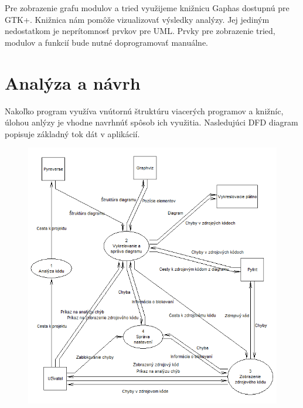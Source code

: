 \documentclass[11pt,oneside,final]{fithesis2}
\begin{document}
		Pre zobrazenie grafu modulov a tried využijeme knižnicu Gaphas dostupnú pre GTK+. Knižnica nám pomôže vizualizovať výsledky analýzy. Jej jediným nedostatkom je neprítomnosť prvkov pre UML. Prvky pre zobrazenie tried, modulov a funkcií bude nutné doprogramovať manuálne.


	\section{Analýza a návrh}
	
	Nakoľko program využíva vnútornú štruktúru viacerých programov a knižníc, úlohou anlýzy je vhodne navrhnúť spôsob ich využitia. Nasledujúci DFD diagram popisuje základný tok dát v aplikácií. 	
	
	\begin{figure}[htb]
	 \centering
	 \includegraphics[width=\textwidth]{images/dfd_main}
	\end{figure}
	
\end{document}
